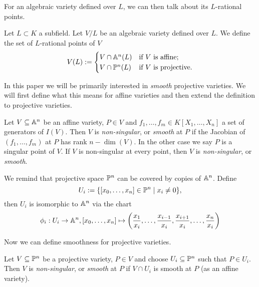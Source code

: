 For an algebraic variety defined over $L$,
we can then talk about its $L$-rational points.

\begin{definition}
	Let $L \subset K$ a subfield.
	Let $V/L$ be an algebraic variety defined over $L$.
 	We define the set
	of $L$-rational points of $V$
	\begin{equation*}
		V(L) := 
		\begin{cases}
			V\cap\mathbb{A}^n(L) &\textrm{if $V$ is affine;}\\
			V\cap\mathbb{P}^n(L) &\textrm{if $V$ is projective.}
		\end{cases}
	\end{equation*}
\end{definition}

In this paper we will be primarily interested in \emph{smooth}
projective varieties.
We will first define what this means for affine varieties and then extend
the definition to projective varieties.

\begin{definition}
	Let $V \subseteq \mathbb{A}^n$ be an affine variety, $P \in V$ and 
	$f_1, \dots, f_m \in K[X_1, \dots, X_n]$ a set of generators of $I(V)$.
	Then $V$ is \emph{non-singular}, or \emph{smooth} at $P$ if the Jacobian
	of $(f_1, \dots, f_m)$ at $P$ has rank $n - \dim(V)$. In the other case we
	say $P$ is a singular point of $V$.
	If $V$ is non-singular at every point, then $V$ is \emph{non-singular},
	or \emph{smooth}.
\end{definition}

We remind that
projective space $\mathbb{P}^n$ can be covered by copies of $\mathbb{A}^n$. Define
\begin{equation*}
	U_i := \{[x_0, \dots, x_n] \in \mathbb{P}^n \mid x_i \neq 0\},
\end{equation*}
then $U_i$ is isomorphic to $\mathbb{A}^n$ via the chart
\begin{equation*}
	\phi_i: U_i \to \mathbb{A}^n, [x_0, \dots, x_n]
	\mapsto \left(\frac{x_1}{x_i}, \dots,
		\frac{x_{i-1}}{x_i}, \frac{x_{i+1}}{x_i}, \dots, 
		\frac{x_n}{x_i}\right)
\end{equation*}

Now we can define smoothness for projective varieties.

\begin{definition}
	Let $V \subseteq \mathbb{P}^n$ be a projective variety,
	$P \in V$ and choose $U_i \subseteq \mathbb{P}^n$ such
	that $P \in U_i$. Then $V$ is \emph{non-singular}, or \emph{smooth}
	at $P$ if $V \cap U_i$ is smooth at $P$ (as an affine variety).
\end{definition}

